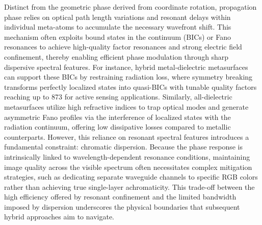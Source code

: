 Distinct from the geometric phase derived from coordinate rotation, propagation phase relies on optical path length variations and resonant delays within individual meta-atoms to accumulate the necessary wavefront shift. This mechanism often exploits bound states in the continuum (BICs) or Fano resonances to achieve high-quality factor resonances and strong electric field confinement, thereby enabling efficient phase modulation through sharp dispersive spectral features. \citep{doi_10_1002_adpr_202400191_88f03cd9} For instance, hybrid metal-dielectric metasurfaces can support these BICs by restraining radiation loss, where symmetry breaking transforms perfectly localized states into quasi-BICs with tunable quality factors reaching up to 873 for active sensing applications. Similarly, all-dielectric metasurfaces utilize high refractive indices to trap optical modes and generate asymmetric Fano profiles via the interference of localized states with the radiation continuum, offering low dissipative losses compared to metallic counterparts. \citep{doi_10_1021_acsnano_4c16934_9c79f5cf} However, this reliance on resonant spectral features introduces a fundamental constraint: chromatic dispersion. Because the phase response is intrinsically linked to wavelength-dependent resonance conditions, maintaining image quality across the visible spectrum often necessitates complex mitigation strategies, such as dedicating separate waveguide channels to specific RGB colors rather than achieving true single-layer achromaticity. This trade-off between the high efficiency offered by resonant confinement and the limited bandwidth imposed by dispersion underscores the physical boundaries that subsequent hybrid approaches aim to navigate. \citep{doi_10_1002_adpr_202400191_88f03cd9} \citep{s2_42f2fcc893f3a45ac750a8ffe67752f8533c0c61_58d9419c} \citep{doi_10_1038_s41377_025_01761_w_a73a6b84}

